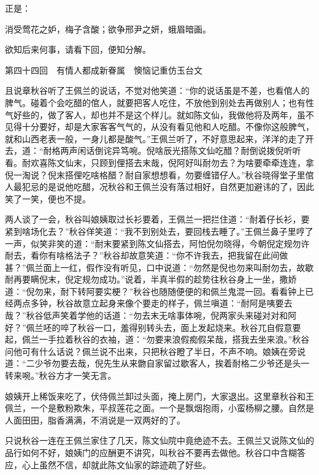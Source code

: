 \documentclass[12pt,UTF8]{ctexbook}
\begin{document}
{{{正是：

消受莺花之妒，梅子含酸；欲争邢尹之妍，蛾眉暗画。

欲知后来何事，请看下回，便知分解。





第四十四回　有情人都成新眷属　懊恼记重仿玉台文





且说章秋谷听了王佩兰的说话，不觉对他笑道：“你的说话虽是不差，也看倌人的脾气。碰着个会吃醋的倌人，就要把客人吃住，不放他到别处去再做别人；也有性气好些的，做了客人，却也并不是这个样儿。就如陈文仙，我做他将及两年，虽不见得十分要好，却是大家客客气气的，从没有看见他和人吃醋。不像你这般脾气，就和山西老表一般，一身儿都是酸气。”王佩兰听了，不好意思起来，洋洋的走了开去，道：“耐格两声闲话倒诧异笃啘。倪啥辰光搭陈文仙吃醋？耐倒说拨倪听听看。耐欢喜陈文仙末，只顾到俚搭去末哉，倪阿好叫耐勿去？为啥要牵牵连连，拿倪一淘说？倪末搭俚吃啥格醋？耐自家想想看，勿要缠错仔人。”秋谷晓得堂子里倌人最犯忌的是说他吃醋，况秋谷和王佩兰没有落过相好，自然更加避讳的了，因此笑了一笑，便也不提。

两人谈了一会，秋谷叫娘姨取过长衫要着，王佩兰一把拦住道：“耐着仔长衫，要紧到啥场化去？”秋谷佯笑道：“我不到别处去，要回栈去睡了。”王佩兰鼻子里哼了一声，似笑非笑的道：“耐末要紧到陈文仙搭去，阿怕倪勿晓得，今朝倪定规勿许耐去，看你有啥格法子？”秋谷却故意笑道：“你不许我去，把我留在此间做甚？”佩兰面上一红，假作没有听见，口中说道：“勿然是倪也勿来叫耐勿去，故歇耐再要瞒倪末，倪定规勿成功。”说着，半真半假的趁势往秋谷身上一坐，撒娇道：“倪勿来，耐下转阿要实梗？”秋谷也随随便便的和佩兰鬼混一回。看看钟上已经两点多钟，秋谷故意立起身来像个要走的样子，佩兰嗔道：“耐阿是咦要去哉？”秋谷低声笑着学他的话道：“勿去末无啥事体啘，倪两家头来碰对对和阿好？”佩兰呸的啐了秋谷一口，羞得别转头去，面上发起烧来。秋谷兀自假意要起，佩兰一手拉着秋谷的衣袖，道：“勿要来浪假痴假呆哉，搭我去坐来浪。”秋谷问他可有什么话说？佩兰说不出来，只把秋谷瞪了半日，不声不响。娘姨在旁说道：“二少爷勿要去哉，倪先生从来朆自家留过歇客人，挨着耐格二少爷还是头一转来啘。”秋谷方才一笑无言。

娘姨开上稀饭来吃了，伏侍佩兰卸过头面，掩上房门，大家退出。这里章秋谷和王佩兰，一个是敷粉欺朱，平叔莲花之面。一个是飘烟抱雨，小蛮杨柳之腰。自然是人面田田，脂香满满，不消说是一双两好的了。

只说秋谷一连在王佩兰家住了几天，陈文仙院中竟绝迹不去。王佩兰又说陈文仙的品行如何不好，娘姨门的应酬更不讲究，叫秋谷不要再去做他。秋谷口中含糊答应，心上虽然不信，却就此陈文仙家的踪迹疏了好些。

}}}
\end{document}

